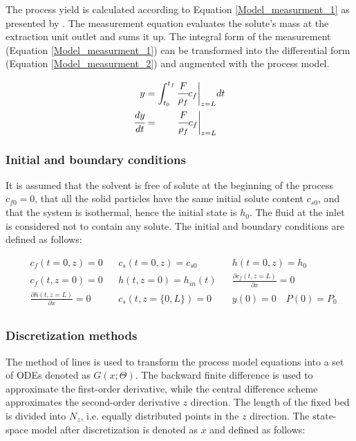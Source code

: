 \documentclass[../Article_Model_Parameters.tex]{subfiles}
\begin{document}
			The process yield is calculated according to Equation \ref{Model_measurment_1} as presented by \citet{Sovova1994a}. The measurement equation evaluates the solute's mass at the extraction unit outlet and sums it up. The integral form of the measurement (Equation \ref{Model_measurment_1}) can be transformed into the differential form (Equation \ref{Model_measurment_2}) and augmented with the process model.
			
			{\footnotesize
				\begin{align} 
					\label{Model_measurment_1}
					y &= \int_{t_0}^{t_f} \cfrac{F}{\rho_f} c_f \biggr\rvert_{z=L} dt \\
					\cfrac{dy}{dt} &= \qquad \cfrac{F}{\rho_f} c_f \biggr\rvert_{z=L} 
					\label{Model_measurment_2}
			\end{align}	}
			
			\subsubsection{Initial and boundary conditions} 
			It is assumed that the solvent is free of solute at the beginning of the process $c_{f0}=0$, that all the solid particles have the same initial solute content $c_{s0}$, and that the system is isothermal, hence the initial state is $h_0$. The fluid at the inlet is considered not to contain any solute. The initial and boundary conditions are defined as follows:
			
			{\footnotesize
				\begin{align*}
					&c_f(t = 0, z) = 0  && c_s(t = 0, z) = c_{s0} && h(t = 0, z) = h_0 \\
					&c_f(t,   z=0) = 0  && h(t, z=0) = h_{in}(t)  && \frac{\partial c_f(t,z=L)}{\partial x} = 0 \\
					&\frac{\partial h(t,z=L)}{\partial x} = 0   && c_s(t, z=\{0,L\}) = 0 && y(0) = 0 \quad P(0) = P_0 \\
			\end{align*} }
			
			\subsubsection{Discretization methods}
			
			The method of lines is used to transform the process model equations into a set of ODEs denoted as $G(x;\Theta)$. The backward finite difference is used to approximate the first-order derivative, while the central difference scheme approximates the second-order derivative $z$ direction. The length of the fixed bed is divided into $N_z$, i.e. equally distributed points in the $z$ direction. The state-space model after discretization is denoted as $x$ and defined as follows:
			
\end{document}
